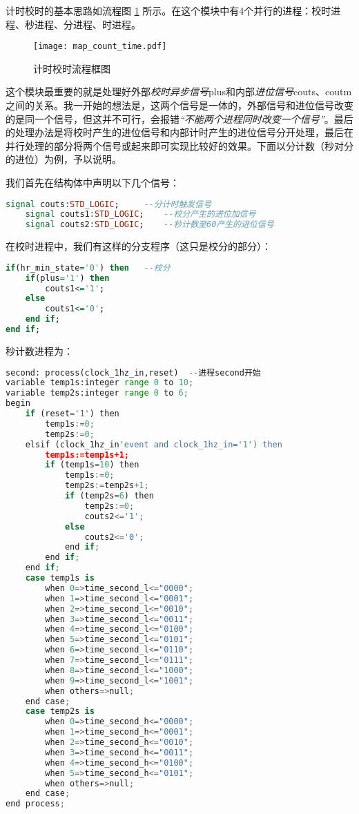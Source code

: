 \documentclass[12pt,AutoFakeBold]{article}
\begin{document}
计时校时的基本思路如流程图 \ref{fig:map_count_time} 所示。在这个模块中有4个并行的进程：校时进程、秒进程、分进程、时进程。
\begin{figure}[htbp]
    \centering
    \texttt{[image: map\_count\_time.pdf]} 	%
    \caption{计时校时流程框图}		%
    \label{fig:map_count_time}							%
\end{figure}

这个模块最重要的就是处理好外部\textit{校时异步信号}\textsf{plus}和内部\textit{进位信号}\textsf{couts、coutm}之间的关系。我一开始的想法是，这两个信号是一体的，外部信号和进位信号改变的是同一个信号，但这并不可行，会报错\textit{“不能两个进程同时改变一个信号”}。最后的处理办法是将校时产生的进位信号和内部计时产生的进位信号分开处理，最后在并行处理的部分将两个信号或起来即可实现比较好的效果。下面以分计数（秒对分的进位）为例，予以说明。

我们首先在结构体中声明以下几个信号：
\begin{lstlisting}[language=vhdl,numbers=none]
    signal couts:STD_LOGIC;     --分计时触发信号
    signal couts1:STD_LOGIC;    --校分产生的进位加信号
    signal couts2:STD_LOGIC;    --秒计数至60产生的进位信号
    \end{lstlisting}
    
在校时进程中，我们有这样的分支程序（这只是校分的部分）：
\begin{lstlisting}[language=vhdl,numbers=none]
if(hr_min_state='0') then 	--校分
    if(plus='1') then 
        couts1<='1';
    else
        couts1<='0';
    end if;
end if;
    \end{lstlisting}
秒计数进程为：
\begin{lstlisting}[language=python]
second: process(clock_1hz_in,reset)  --进程second开始
variable temp1s:integer range 0 to 10;
variable temp2s:integer range 0 to 6;
begin
    if (reset='1') then
        temp1s:=0;
        temp2s:=0;
    elsif (clock_1hz_in'event and clock_1hz_in='1') then
        temp1s:=temp1s+1;
        if (temp1s=10) then
            temp1s:=0;
            temp2s:=temp2s+1;
            if (temp2s=6) then
                temp2s:=0;
                couts2<='1';
            else
                couts2<='0';
            end if;
        end if;
    end if;
    case temp1s is
        when 0=>time_second_l<="0000";
        when 1=>time_second_l<="0001";
        when 2=>time_second_l<="0010";
        when 3=>time_second_l<="0011";
        when 4=>time_second_l<="0100";
        when 5=>time_second_l<="0101";
        when 6=>time_second_l<="0110";
        when 7=>time_second_l<="0111";
        when 8=>time_second_l<="1000";
        when 9=>time_second_l<="1001";
        when others=>null;
    end case;
    case temp2s is
        when 0=>time_second_h<="0000";
        when 1=>time_second_h<="0001";
        when 2=>time_second_h<="0010";
        when 3=>time_second_h<="0011";
        when 4=>time_second_h<="0100";
        when 5=>time_second_h<="0101";
        when others=>null;
    end case;
end process;
\end{lstlisting}
\end{document}
